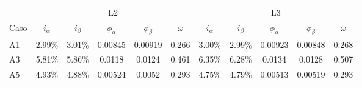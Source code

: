 \begin{tabular}{lcccccccccc}
\toprule
 & \multicolumn{5}{c}{L2} & \multicolumn{5}{c}{L3} \\
Caso & $i_\alpha$ & $i_\beta$ & $\phi_\alpha$ & $\phi_\beta$ & $\omega$ & $i_\alpha$ & $i_\beta$ & $\phi_\alpha$ & $\phi_\beta$ & $\omega$ \\
\midrule
A1 & 2.99\% & 3.01\% & 0.00845 & 0.00919 & 0.266 & 3.00\% & 2.99\% & 0.00923 & 0.00848 & 0.268 \\
A3 & 5.81\% & 5.86\% & 0.0118 & 0.0124 & 0.461 & 6.35\% & 6.28\% & 0.0134 & 0.0128 & 0.507 \\
A5 & 4.93\% & 4.88\% & 0.00524 & 0.0052 & 0.293 & 4.75\% & 4.79\% & 0.00513 & 0.00519 & 0.293 \\
\bottomrule
\end{tabular}
